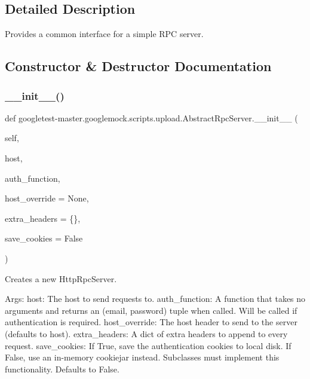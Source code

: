 \subsection{Detailed Description}
\begin{DoxyVerb}Provides a common interface for a simple RPC server.\end{DoxyVerb}
 

\subsection{Constructor \& Destructor Documentation}
\mbox{\label{classgoogletest-master_1_1googlemock_1_1scripts_1_1upload_1_1_abstract_rpc_server_ae3edd194f5ff2aee2be42edbebb95ad1}} 
\subsubsection{\texorpdfstring{\_\_init\_\_()}{\_\_init\_\_()}}
{\footnotesize\ttfamily def googletest-\/master.\+googlemock.\+scripts.\+upload.\+Abstract\+Rpc\+Server.\+\_\+\+\_\+init\+\_\+\+\_\+ (\begin{DoxyParamCaption}\item[{}]{self,  }\item[{}]{host,  }\item[{}]{auth\+\_\+function,  }\item[{}]{host\+\_\+override = {\ttfamily None},  }\item[{}]{extra\+\_\+headers = {\ttfamily \{\}},  }\item[{}]{save\+\_\+cookies = {\ttfamily False} }\end{DoxyParamCaption})}

\begin{DoxyVerb}Creates a new HttpRpcServer.

Args:
  host: The host to send requests to.
  auth_function: A function that takes no arguments and returns an
(email, password) tuple when called. Will be called if authentication
is required.
  host_override: The host header to send to the server (defaults to host).
  extra_headers: A dict of extra headers to append to every request.
  save_cookies: If True, save the authentication cookies to local disk.
If False, use an in-memory cookiejar instead.  Subclasses must
implement this functionality.  Defaults to False.
\end{DoxyVerb}
 

